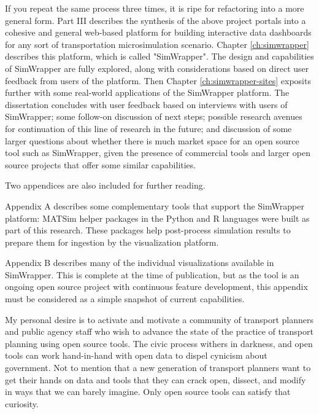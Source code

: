 If you repeat the same process three times, it is ripe for refactoring into a more general form. Part III describes the synthesis of the above project portals into a cohesive and general web-based platform for building interactive data dashboards for any sort of transportation microsimulation scenario. Chapter \ref{ch:simwrapper} describes this platform, which is called "SimWrapper". The design and capabilities of SimWrapper are fully explored, along with considerations based on direct user feedback from users of the platform. Then Chapter \ref{ch:simwrapper-sites} exposits further with some real-world applications of the SimWrapper platform. The dissertation concludes with user feedback based on interviews with users of SimWrapper; some follow-on discussion of next steps; possible research avenues for continuation of this line of research in the future; and discussion of some larger questions about whether there is much market space for an open source tool such as SimWrapper, given the presence of commercial tools and larger open source projects that offer some similar capabilities.

Two appendices are also included for further reading.

Appendix A describes some complementary tools that support the SimWrapper platform: MATSim helper packages in the Python and R languages were built as part of this research. These packages help post-process simulation results to prepare them for ingestion by the visualization platform.

Appendix B describes many of the individual visualizations available in SimWrapper. This is complete at the time of publication, but as the tool is an ongoing open source project with continuous feature development, this appendix must be considered as a simple snapshot of current capabilities.

My personal desire is to activate and motivate a community of transport planners and public agency staff who wish to advance the state of the practice of transport planning using open source tools. The civic process withers in darkness, and open tools can work hand-in-hand with open data to dispel cynicism about government. Not to mention that a new generation of transport planners want to get their hands on data and tools that they can crack open, dissect, and modify in ways that we can barely imagine. Only open source tools can satisfy that curiosity.


